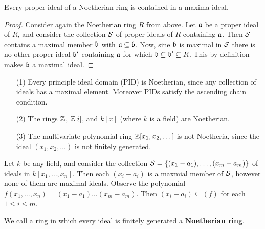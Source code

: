 \begin{corollary}
    Every proper ideal of a Noetherian ring is contained in a maxima ideal.
\end{corollary}
\begin{proof}
    Consider again the Noetherian ring $R$ from above. Let $\af$ be a proper ideal
    of  $R$, and consider the collection $\Sc$ of proper ideals of $R$
    containing  $\af$. Then $\Sc$ contains a maximal member $\bf$ with $\af
    \subseteq \bf$. Now, sine $\bf$ is maximal in $\Sc$ there is no other proper
    ideal $\bf'$ containing $\af$ for which $\bf \subseteq \bf' \subseteq R$.
    This by definition makes $\bf$ a maximal ideal.
\end{proof}

\begin{example}\label{example_1.9}
    \begin{enumerate}
        \item[(1)] Every principle ideal domain (PID) is Noetherian, since any
            collection of ideals has a maximal element. Moreover PIDs satisfy the
            ascending chain condition.

        \item[(2)] The rings $\Z$, $\Z[i]$, and $k[x]$ (where $k$ is a field)
            are Noetherian.

        \item[(3)] The multivariate polynomial ring $\Z[x_1, x_2, \dots]$ is not
            Noetheria, since the ideal $(x_1, x_2, \dots)$ is not finitely
            generated.
    \end{enumerate}
\end{example}

\begin{example}\label{example_1.10}
    Let $k$ be any field, and consider the collection  $\Sc=\{(x_1-a_1), \dots,
    (x_m-a_m)\}$ of ideals in $k[x_1, \dots, x_n]$. Then each $(x_i-a_i)$ is a
    maxmial member of $\Sc$, however none of them are maximal ideals. Observe
    the polynomial  $f(x_1, \dots, x_n)=(x_1-a_1) \dots (x_m-a_m)$. Then
    $(x_i-a_i) \subseteq (f)$ for each $1 \leq i \leq m$.
\end{example}

\begin{definition}
    We call a ring in which every ideal is finitely generated a
    \textbf{Noetherian ring}.
\end{definition}

